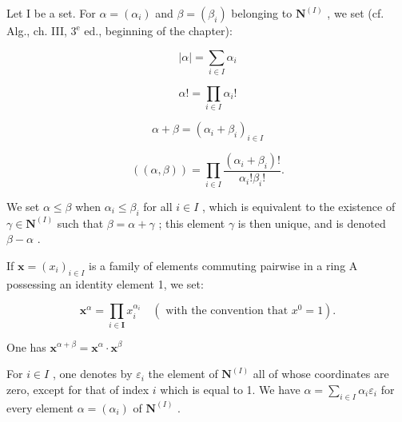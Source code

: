 
Let I be a set. For \(\alpha = (\alpha_{i})\) and \(\beta = (\beta_{i})\) belonging to \(\mathbf{N}^{(I)}\) , we set (cf. Alg., ch. III, \(3^{\mathrm{e}}\) ed., beginning of the chapter):

\[
| \alpha | = \sum_ {i \in I} \alpha_ {i}
\]

\[
\alpha ! = \prod_ {i \in I} \alpha_ {i}!
\]

\[
\alpha + \beta = (\alpha_ {i} + \beta_ {i}) _ {i \in I}
\]

\[
((\alpha , \beta)) = \prod_ {i \in I} \frac {(\alpha_ {i} + \beta_ {i}) !}{\alpha_ {i} ! \beta_ {i} !}.
\]

We set \(\alpha \leqslant \beta\) when \(\alpha_{i} \leqslant \beta_{i}\) for all \(i \in I\) , which is equivalent to the existence of \(\gamma \in \mathbf{N}^{(I)}\) such that \(\beta = \alpha + \gamma\) ; this element \(\gamma\) is then unique, and is denoted \(\beta - \alpha\) .

If \(\mathbf{x} = (x_i)_{i \in I}\) is a family of elements commuting pairwise in a ring A possessing an identity element 1, we set:

\[
\mathbf {x} ^ {\alpha} = \prod_ {i \in \mathbf {I}} x _ {i} ^ {\alpha_ {i}} \quad (\text { with   the   convention   that } x ^ {0} = 1).
\]

One has \(\mathbf{x}^{\alpha +\beta} = \mathbf{x}^{\alpha}\cdot \mathbf{x}^{\beta}\)

For \(i\in I\) , one denotes by \(\varepsilon_{i}\) the element of \(\mathbf{N}^{(I)}\) all of whose coordinates are zero, except for that of index \(i\) which is equal to 1. We have \(\alpha=\sum_{i\in I}\alpha_{i}\varepsilon_{i}\) for every element \(\alpha=(\alpha_{i})\) of \(\mathbf{N}^{(I)}\) .


